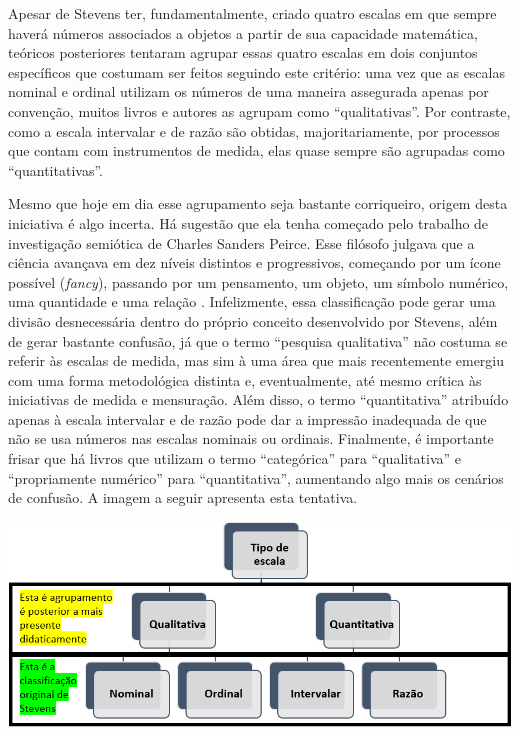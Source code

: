 \documentclass[
]{book}
\begin{document}
Apesar de Stevens ter, fundamentalmente, criado quatro escalas em que sempre haverá números associados a objetos a partir de sua capacidade matemática, teóricos posteriores tentaram agrupar essas quatro escalas em dois conjuntos específicos que costumam ser feitos seguindo este critério: uma vez que as escalas nominal e ordinal utilizam os números de uma maneira assegurada apenas por convenção, muitos livros e autores as agrupam como ``qualitativas''. Por contraste, como a escala intervalar e de razão são obtidas, majoritariamente, por processos que contam com instrumentos de medida, elas quase sempre são agrupadas como ``quantitativas''.

Mesmo que hoje em dia esse agrupamento seja bastante corriqueiro, origem desta iniciativa é algo incerta. Há sugestão que ela tenha começado pelo trabalho de investigação semiótica de Charles Sanders Peirce. Esse filósofo julgava que a ciência avançava em dez níveis distintos e progressivos, começando por um ícone possível (\emph{fancy}), passando por um pensamento, um objeto, um símbolo numérico, uma quantidade e uma relação \citep[p.289]{smart1999}. Infelizmente, essa classificação pode gerar uma divisão desnecessária dentro do próprio conceito desenvolvido por Stevens, além de gerar bastante confusão, já que o termo ``pesquisa qualitativa'' não costuma se referir às escalas de medida, mas sim à uma área que mais recentemente emergiu com uma forma metodológica distinta e, eventualmente, até mesmo crítica às iniciativas de medida e mensuração. Além disso, o termo ``quantitativa'' atribuído apenas à escala intervalar e de razão pode dar a impressão inadequada de que não se usa números nas escalas nominais ou ordinais. Finalmente, é importante frisar que há livros que utilizam o termo ``categórica'' para ``qualitativa'' e ``propriamente numérico'' para ``quantitativa'', aumentando algo mais os cenários de confusão. A imagem a seguir apresenta esta tentativa.

\includegraphics{./img/cap_escala_medida_agrupamento.png}
\end{document}
